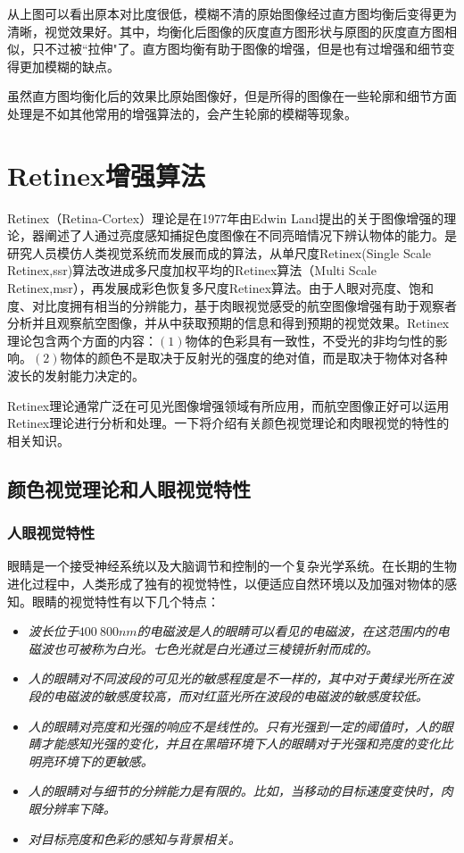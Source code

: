 从上图可以看出原本对比度很低，模糊不清的原始图像经过直方图均衡后变得更为清晰，视觉效果好。其中，均衡化后图像的灰度直方图形状与原图的灰度直方图相似，只不过被“拉伸"了。直方图均衡有助于图像的增强，但是也有过增强和细节变得更加模糊的缺点。

虽然直方图均衡化后的效果比原始图像好，但是所得的图像在一些轮廓和细节方面处理是不如其他常用的增强算法的，会产生轮廓的模糊等现象。
		\section{Retinex增强算法}	Retinex（Retina-Cortex）理论是在1977年由Edwin Land提出的关于图像增强的理论，器阐述了人通过亮度感知捕捉色度图像在不同亮暗情况下辨认物体的能力。是研究人员模仿人类视觉系统而发展而成的算法，从单尺度Retinex(Single Scale Retinex,ssr)算法改进成多尺度加权平均的Retinex算法（Multi Scale Retinex,msr），再发展成彩色恢复多尺度Retinex算法。由于人眼对亮度、饱和度、对比度拥有相当的分辨能力，基于肉眼视觉感受的航空图像增强有助于观察者分析并且观察航空图像，并从中获取预期的信息和得到预期的视觉效果。Retinex理论包含两个方面的内容：$(1)$物体的色彩具有一致性，不受光的非均匀性的影响。$(2)$物体的颜色不是取决于反射光的强度的绝对值，而是取决于物体对各种波长的发射能力决定的。

Retinex理论通常广泛在可见光图像增强领域有所应用，而航空图像正好可以运用Retinex理论进行分析和处理。一下将介绍有关颜色视觉理论和肉眼视觉的特性的相关知识。
			\subsection{颜色视觉理论和人眼视觉特性}
				\subsubsection{人眼视觉特性}眼睛是一个接受神经系统以及大脑调节和控制的一个复杂光学系统。在长期的生物进化过程中，人类形成了独有的视觉特性，以便适应自然环境以及加强对物体的感知。眼睛的视觉特性有以下几个特点：
				\begin{itemize}
					\item \emph{波长位于$400~800nm$的电磁波是人的眼睛可以看见的电磁波，在这范围内的电磁波也可被称为白光。七色光就是白光通过三棱镜折射而成的。}
					\item \emph{人的眼睛对不同波段的可见光的敏感程度是不一样的，其中对于黄绿光所在波段的电磁波的敏感度较高，而对红蓝光所在波段的电磁波的敏感度较低。}
					\item \emph{人的眼睛对亮度和光强的响应不是线性的。只有光强到一定的阈值时，人的眼睛才能感知光强的变化，并且在黑暗环境下人的眼睛对于光强和亮度的变化比明亮环境下的更敏感。}
					\item \emph{人的眼睛对与细节的分辨能力是有限的。比如，当移动的目标速度变快时，肉眼分辨率下降。}
					\item \emph{对目标亮度和色彩的感知与背景相关。}
				\end{itemize}

